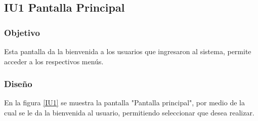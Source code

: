 \subsection{IU1 Pantalla Principal}

\subsubsection{Objetivo}
	
Esta pantalla da la bienvenida a los usuarios que ingresaron al sistema, permite acceder a los respectivos menús.

\subsubsection{Diseño}

    En la figura \ref{IU1} se muestra la pantalla "Pantalla principal", por medio de la cual se le da la bienvenida al usuario, permitiendo seleccionar que desea realizar.
 

